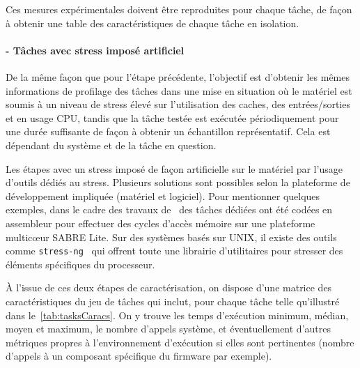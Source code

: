 \documentclass[french, a4paper, 11pt, twoside, pdftex]{StyleThese}
\begin{document}
			Ces mesures expérimentales doivent être reproduites pour chaque tâche, de façon à obtenir une table des caractéristiques de chaque tâche en isolation.
                    
    	\paragraph{ - Tâches avec stress imposé artificiel}
    		
    		De la même façon que pour l'étape précédente, l'objectif est d'obtenir les mêmes informations de profilage des tâches dans une mise en situation où le matériel est soumis à un niveau de stress élevé sur l'utilisation des caches, des entrées/sorties et en usage CPU, tandis que la tâche testée est exécutée périodiquement pour une durée suffisante de façon à obtenir un échantillon représentatif. Cela est dépendant du système et de la tâche en question.
    		
    		Les étapes avec un stress imposé de façon artificielle sur le matériel par l'usage d'outils dédiés au stress. Plusieurs solutions sont possibles selon la plateforme de développement impliquée (matériel et logiciel). Pour mentionner quelques exemples, dans le cadre des travaux de~\cite{blin_maximizing_2016} des tâches dédiées ont été codées en assembleur pour effectuer des cycles d'accès mémoire sur une plateforme multicœur SABRE Lite. Sur des systèmes basés sur UNIX, il existe des outils comme \texttt{stress-ng}~\cite{king_stress-ng_2019} qui offrent toute une librairie d'utilitaires pour stresser des éléments spécifiques du processeur. 
    	
	    	À l'issue de ces deux étapes de caractérisation, on dispose d'une matrice des caractéristiques du jeu de tâches qui inclut, pour chaque tâche telle qu'illustré dans le~\autoref{tab:tasksCaracs}. On y trouve les temps d'exécution minimum, médian, moyen et maximum, le nombre d'appels système, et éventuellement d'autres métriques propres à l'environnement d'exécution si elles sont pertinentes (nombre d'appels à un composant spécifique du firmware par exemple). 
	    	    	
\end{document}
